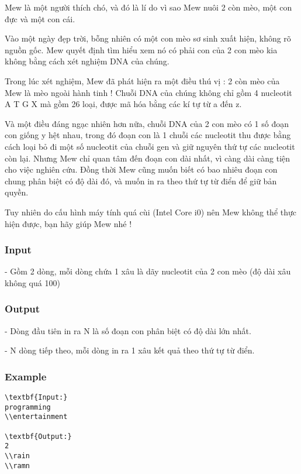 



   Mew là một người thích chó, và đó là lí do vì sao Mew nuôi 2 còn mèo, một con đực và một con cái.  

   Vào một ngày đẹp trời, bỗng nhiên có một con mèo sơ sinh xuất hiện, không rõ nguồn gốc. Mew quyết định tìm hiểu xem nó có phải con của 2 con mèo kia không bằng cách xét nghiệm DNA của chúng.  

   Trong lúc xét nghiệm, Mew đã phát hiện ra một điều thú vị : 2 còn mèo của Mew là mèo ngoài hành tinh ! Chuỗi DNA của chúng không chỉ gồm 4 nucleotit A T G X mà gồm 26 loại, được mã hóa bằng các kí tự từ a đến z.  

   Và một điều đáng ngạc nhiên hơn nữa, chuỗi DNA của 2 con mèo có 1 số đoạn con giống y hệt nhau, trong đó đoạn con là 1 chuỗi các nucleotit thu được bằng cách loại bỏ đi một số nucleotit của chuỗi gen và giữ nguyên thứ tự các nucleotit còn lại. Nhưng Mew chỉ quan tâm đến đoạn con dài nhất, vì càng dài càng tiện cho việc nghiên cứu. Đồng thời Mew cũng muốn biết có bao nhiêu đoạn con chung phân biệt có độ dài đó, và muốn in ra theo thứ tự từ điển để giữ bản quyền.  

   Tuy nhiên do cấu hình máy tính quá cùi (Intel Core i0) nên Mew không thể thực hiện được, bạn hãy giúp Mew nhé !  

\subsubsection{   Input  }

   - Gồm 2 dòng, mỗi dòng chứa 1 xâu là dãy nucleotit của 2 con mèo (độ dài xâu không quá 100)  

\subsubsection{   Output  }

   - Dòng đầu tiên in ra N là số đoạn con phân biệt có độ dài lớn nhất.  

   - N dòng tiếp theo, mỗi dòng in ra 1 xâu kết quả theo thứ tự từ điển.  

\subsubsection{   Example  }
\begin{verbatim}
\textbf{Input:}
programming
\\entertainment

\textbf{Output:}
2
\\rain
\\ramn \end{verbatim}